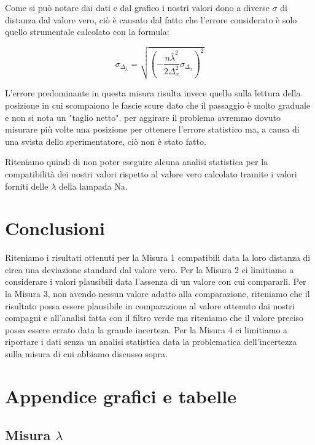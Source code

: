 \documentclass{article}
\begin{document}
Come si può notare dai dati e dal grafico i nostri valori dono a diverse $\sigma$ di distanza dal valore vero, ciò è causato dal fatto che l'errore considerato è solo quello strumentale calcolato con la formula:

\begin{equation} 
\sigma_{\Delta_\lambda} = \sqrt{ ({-} \frac{n {\bar \lambda}^2}{2 \Delta_x^2} \sigma_{\Delta_x})^2} 
\end{equation}

L'errore predominante in questa misura risulta invece quello sulla lettura della posizione in cui scompaiono le fascie scure dato che il passaggio è molto graduale e non si nota un "taglio netto".%
 per aggirare il problema avremmo dovuto misurare più volte una posizione per ottenere l'errore statistico ma, a causa di una svista dello sperimentatore, ciò non è stato fatto. 

Riteniamo quindi di non poter eseguire alcuna analisi statistica per la compatibilità dei nostri valori rispetto al valore vero calcolato tramite i valori forniti delle $\lambda$ della lampada Na.




\section{Conclusioni}
Riteniamo i risultati ottenuti per la Misura 1 compatibili data la loro distanza di circa una deviazione standard dal valore vero. Per la Misura 2 ci limitiamo a considerare i valori plausibili data l'assenza di un valore con cui compararli. Per la Misura 3, non avendo nessun valore adatto alla comparazione, riteniamo che il risultato possa essere plausibile in comparazione al valore ottenuto dai nostri compagni e all'analisi fatta con il filtro verde ma riteniamo che il valore preciso possa essere errato data la grande incerteza. Per la Misura 4 ci limitiamo a riportare i dati senza un analisi statistica data la problematica dell'incertezza sulla misura di cui abbiamo discusso sopra.




\section{Appendice grafici e tabelle}
\subsection{Misura $\lambda$}
\end{document}
